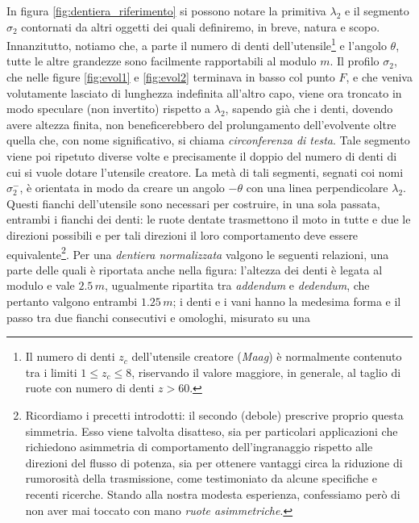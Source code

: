 \noindent In figura \ref{fig:dentiera_riferimento} si possono notare
 la primitiva $\lambda_2$ e il segmento $\sigma_2$ contornati da
 altri oggetti
dei quali definiremo, in breve, natura e scopo.
Innanzitutto, notiamo che, a parte il numero
 di denti dell'utensile\footnote{
Il numero di denti $z_c$ dell'utensile creatore ({\em Maag}) \`e normalmente contenuto
tra i limiti $1\le z_c \le 8$, riservando il valore maggiore,
in generale, al taglio di ruote con numero di denti $z>60$.
}
e l'angolo $\theta$, tutte
le altre grandezze sono facilmente rapportabili al modulo $m$.
Il profilo $\sigma_2$, che nelle figure \ref{fig:evol1} e \ref{fig:evol2}
terminava in basso col punto $F$, e che veniva volutamente lasciato di
lunghezza indefinita all'altro capo, viene ora troncato in modo speculare
(non invertito)
rispetto a $\lambda_2$, sapendo gi\`a che i denti, dovendo avere altezza
finita, non beneficerebbero del prolungamento dell'evolvente oltre quella che,
con nome significativo, si chiama {\em circonferenza di testa}.
Tale segmento viene poi ripetuto diverse volte e precisamente
il doppio del numero di denti di cui si vuole dotare l'utensile creatore.
La met\`a di tali segmenti, segnati coi nomi $\sigma_2^-$, 
\`e orientata in modo da creare un angolo
$-\theta$ con una linea perpendicolare  $\lambda_2$. Questi fianchi
dell'utensile sono necessari
per costruire, in una sola passata, entrambi i fianchi dei denti: le ruote
dentate trasmettono il moto in tutte e due le direzioni possibili e per
tali direzioni il loro comportamento deve essere equivalente\footnote{
Ricordiamo i precetti introdotti: il secondo (debole) prescrive
proprio questa simmetria. Esso viene talvolta disatteso, sia per particolari
applicazioni che richiedono asimmetria di comportamento dell'ingranaggio
rispetto alle direzioni del flusso di potenza, sia per ottenere
vantaggi circa la riduzione di rumorosit\`a della trasmissione, come 
testimoniato da alcune specifiche e recenti ricerche.
Stando alla nostra modesta esperienza,
confessiamo per\`o di non aver mai toccato con mano
 {\em ruote asimmetriche}.}.
Per una {\em dentiera normalizzata}
valgono le seguenti relazioni, una parte delle quali \`e riportata 
anche nella figura:
l'altezza dei denti \`e legata al modulo e vale $2.5\,m$, ugualmente
ripartita tra {\em addendum} e {\em dedendum},
che pertanto valgono entrambi $1.25\, m$; i denti e i vani hanno la 
medesima forma e il passo tra due fianchi consecutivi e omologhi,
misurato su una
